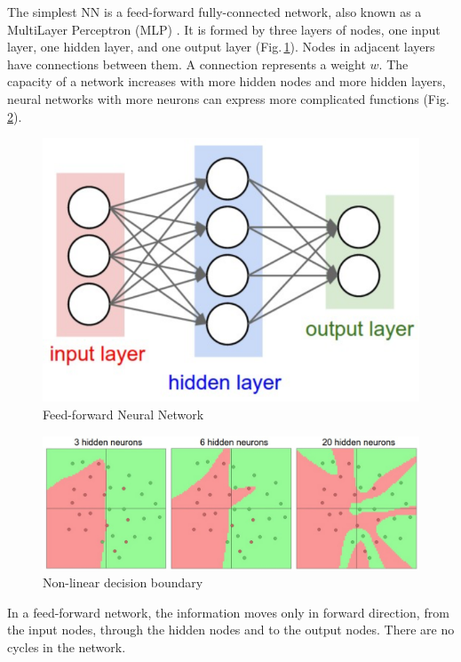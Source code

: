 The simplest NN is a feed-forward fully-connected network, also known as a MultiLayer Perceptron (MLP) \citep{Orbach1962}. It is formed by three layers of nodes, one input layer, one hidden layer, and one output layer (Fig.\,\ref{one_layer}). Nodes in adjacent layers have connections between them. A connection represents a weight $w$. The capacity of a network increases with more hidden nodes and more hidden layers, neural networks with more neurons can express more complicated functions (Fig.\,\ref{anyfunction}).

\begin{figure}[h]
	\centering
	\includegraphics[scale=0.5]{Figs/1hidden.png}
    \caption{Feed-forward Neural Network  \citep{cs231n}}
    \label{one_layer}
\end{figure}

\begin{figure}[h]
	\centering
	\includegraphics[scale=0.5]{Figs/anyfunction.png}
    \caption{Non-linear decision boundary \citep{cs231n}}
    \label{anyfunction}
\end{figure}

In a feed-forward network, the information moves only in forward direction, from the input nodes, through the hidden nodes and to the output nodes. There are no cycles in the network.

